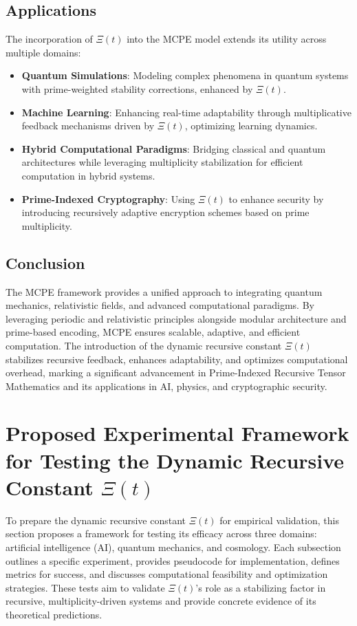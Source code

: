 \documentclass{article}
\theoremstyle{plain}
\begin{document}
\subsection{Applications}
The incorporation of \(\Xi(t) \) into the MCPE model extends its utility across multiple domains:
\begin{itemize}
    \item \textbf{Quantum Simulations}: Modeling complex phenomena in quantum systems with prime-weighted stability corrections, enhanced by \(\Xi(t) \).
    \item \textbf{Machine Learning}: Enhancing real-time adaptability through multiplicative feedback mechanisms driven by \(\Xi(t) \), optimizing learning dynamics.
    \item \textbf{Hybrid Computational Paradigms}: Bridging classical and quantum architectures while leveraging multiplicity stabilization for efficient computation in hybrid systems.
    \item \textbf{Prime-Indexed Cryptography}: Using \(\Xi(t) \) to enhance security by introducing recursively adaptive encryption schemes based on prime multiplicity.
\end{itemize}

\subsection{Conclusion}
The MCPE framework provides a unified approach to integrating quantum mechanics, relativistic fields, and advanced computational paradigms. By leveraging periodic and relativistic principles alongside modular architecture and prime-based encoding, MCPE ensures scalable, adaptive, and efficient computation. The introduction of the dynamic recursive constant \(\Xi(t) \) stabilizes recursive feedback, enhances adaptability, and optimizes computational overhead, marking a significant advancement in Prime-Indexed Recursive Tensor Mathematics and its applications in AI, physics, and cryptographic security.
\section{Proposed Experimental Framework for Testing the Dynamic Recursive Constant \(\Xi(t) \)}
\label{sec:experimental_framework}

To prepare the dynamic recursive constant \(\Xi(t) \) for empirical validation, this section proposes a framework for testing its efficacy across three domains: artificial intelligence (AI), quantum mechanics, and cosmology. Each subsection outlines a specific experiment, provides pseudocode for implementation, defines metrics for success, and discusses computational feasibility and optimization strategies. These tests aim to validate \(\Xi(t) \)'s role as a stabilizing factor in recursive, multiplicity-driven systems and provide concrete evidence of its theoretical predictions.
\end{document}
